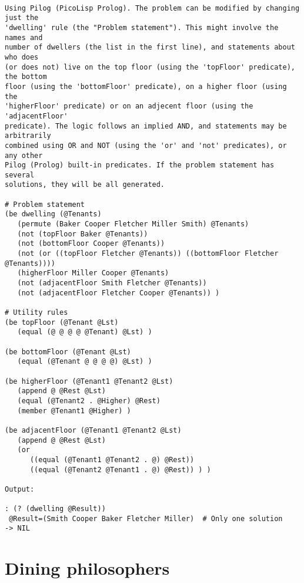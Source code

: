 \begin{verbatim}

Using Pilog (PicoLisp Prolog). The problem can be modified by changing just the
'dwelling' rule (the "Problem statement"). This might involve the names and
number of dwellers (the list in the first line), and statements about who does
(or does not) live on the top floor (using the 'topFloor' predicate), the bottom
floor (using the 'bottomFloor' predicate), on a higher floor (using the
'higherFloor' predicate) or on an adjecent floor (using the 'adjacentFloor'
predicate). The logic follows an implied AND, and statements may be arbitrarily
combined using OR and NOT (using the 'or' and 'not' predicates), or any other
Pilog (Prolog) built-in predicates. If the problem statement has several
solutions, they will be all generated.

# Problem statement
(be dwelling (@Tenants)
   (permute (Baker Cooper Fletcher Miller Smith) @Tenants)
   (not (topFloor Baker @Tenants))
   (not (bottomFloor Cooper @Tenants))
   (not (or ((topFloor Fletcher @Tenants)) ((bottomFloor Fletcher @Tenants))))
   (higherFloor Miller Cooper @Tenants)
   (not (adjacentFloor Smith Fletcher @Tenants))
   (not (adjacentFloor Fletcher Cooper @Tenants)) )

# Utility rules
(be topFloor (@Tenant @Lst)
   (equal (@ @ @ @ @Tenant) @Lst) )

(be bottomFloor (@Tenant @Lst)
   (equal (@Tenant @ @ @ @) @Lst) )

(be higherFloor (@Tenant1 @Tenant2 @Lst)
   (append @ @Rest @Lst)
   (equal (@Tenant2 . @Higher) @Rest)
   (member @Tenant1 @Higher) )

(be adjacentFloor (@Tenant1 @Tenant2 @Lst)
   (append @ @Rest @Lst)
   (or
      ((equal (@Tenant1 @Tenant2 . @) @Rest))
      ((equal (@Tenant2 @Tenant1 . @) @Rest)) ) )

Output:

: (? (dwelling @Result))
 @Result=(Smith Cooper Baker Fletcher Miller)  # Only one solution
-> NIL

\end{verbatim}

\section*{Dining philosophers}

